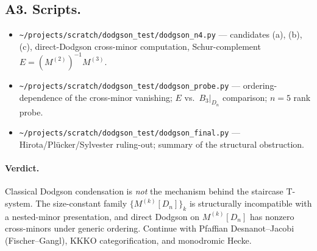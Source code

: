 \documentclass[11pt]{article}
\theoremstyle{definition}
\begin{document}
\subsection*{A3. Scripts.}
\begin{itemize}
  \item \texttt{\~{}/projects/scratch/dodgson\_test/dodgson\_n4.py} --- candidates (a), (b), (c), direct-Dodgson cross-minor computation, Schur-complement $E = (M^{(2)})^{-1}M^{(3)}$.
  \item \texttt{\~{}/projects/scratch/dodgson\_test/dodgson\_probe.py} --- ordering-dependence of the cross-minor vanishing; $E$ vs.\ $B_3|_{D_n}$ comparison; $n=5$ rank probe.
  \item \texttt{\~{}/projects/scratch/dodgson\_test/dodgson\_final.py} --- Hirota/Pl\"ucker/Sylvester ruling-out; summary of the structural obstruction.
\end{itemize}

\paragraph{Verdict.} Classical Dodgson condensation is \emph{not} the mechanism behind the staircase T-system. The size-constant family $\{M^{(k)}[D_n]\}_k$ is structurally incompatible with a nested-minor presentation, and direct Dodgson on $M^{(k)}[D_n]$ has nonzero cross-minors under generic ordering. Continue with Pfaffian Desnanot--Jacobi (Fischer--Gangl), KKKO categorification, and monodromic Hecke.
\end{document}
